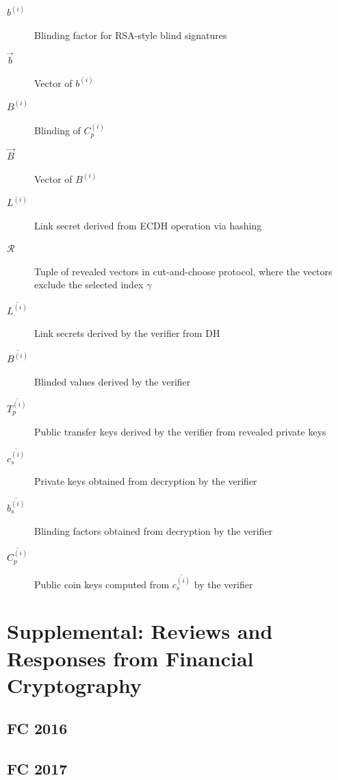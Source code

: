 \documentclass[sigconf, authordraft]{acmart}
\begin{document}
\begin{description}
  \item[$b^{(i)}$]{Blinding factor for RSA-style blind signatures}
  \item[$\vec{b}$]{Vector of $b^{(i)}$}
  \item[$B^{(i)}$]{Blinding of $C_p^{(i)}$}
  \item[$\vec{B}$]{Vector of $B^{(i)}$}
  \item[$L^{(i)}$]{Link secret derived from ECDH operation via hashing}
  \item[$\mathcal{R}$]{Tuple of revealed vectors in cut-and-choose protocol,
    where the vectors exclude the selected index $\gamma$}
  \item[$\overline{L^{(i)}}$]{Link secrets derived by the verifier from DH}
  \item[$\overline{B^{(i)}}$]{Blinded values derived by the verifier}
  \item[$\overline{T_p^{(i)}}$]{Public transfer keys derived by the verifier from revealed private keys}
  \item[$\overline{c_s^{(i)}}$]{Private keys obtained from decryption by the verifier}
  \item[$\overline{b_s^{(i)}}$]{Blinding factors obtained from decryption by the verifier}
  \item[$\overline{C^{(i)}_p}$]{Public coin keys computed from $\overline{c_s^{(i)}}$ by the verifier}
\end{description}

\newpage
\onecolumn
\section{Supplemental: Reviews and Responses from Financial Cryptography}

\subsection{FC 2016}


\subsection{FC 2017}

\end{document}
